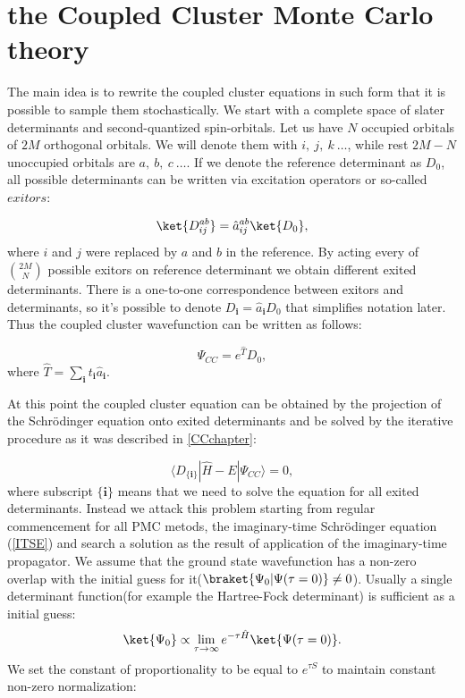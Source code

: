 \documentclass[twoside,english]{uiofysmaster}
\begin{document}
\section{the Coupled Cluster Monte Carlo theory}
The main idea is to rewrite the coupled cluster equations in such form that it is possible to sample them stochastically. We start with a complete space of slater determinants and second-quantized spin-orbitals. Let us have $N$ occupied orbitals of $2M$ orthogonal orbitals. We will denote them with $i,\ j,\ k \ \dots$, while rest $2M-N$ unoccupied orbitals are $a, \ b, \ c \ \dots$.
If we denote the reference determinant as $D_0$, all possible determinants can be written via excitation operators or so-called $exitors$:

\begin{equation}
\ket{D_{ij}^{ab}} = \hat{a}_{ij}^{ab}\ket{ D_0},
\end{equation}
where $i$ and $j$ were replaced  by $a$ and $b$ in the reference. By acting every of $\binom {2M}{N}$ possible exitors on reference determinant we obtain different exited determinants. There is a one-to-one correspondence between exitors and determinants, so it's possible to denote $D_{\boldsymbol{i}} = \hat{a}_{\boldsymbol{i}} D_0$ that simplifies notation later. Thus the coupled cluster wavefunction can be written as follows:

\begin{equation}
\Psi_{CC}=e^{\hat{T}}D_0, 
\end{equation}
where $\hat{T} = \sum_{\boldsymbol{i}} t_{\boldsymbol{i}} \hat{a}_{\boldsymbol{i}}$.

At this point the coupled cluster equation can be obtained by the projection of the Schr\"{o}dinger equation onto exited determinants and be solved by the iterative procedure as it was described in \autoref{CCchapter}:

\begin{equation}\label{CCbf}
\langle D_{\{\boldsymbol{i}\}}|\hat{H}-E|\Psi_{CC}\rangle = 0, 
\end{equation}
where subscript $\{\boldsymbol{i}\}$ means that we need to solve the equation for all exited determinants. Instead we attack this problem starting from regular commencement for all PMC metods, the imaginary-time Schr\"{o}dinger equation (\ref{ITSE}) and search a solution as the result of application of the imaginary-time propagator. We assume that the ground state wavefunction has a non-zero overlap with the initial guess for it($\braket{\Psi_0|\Psi(\tau=0)} \neq 0$). Usually a single determinant function(for example the Hartree-Fock determinant) is sufficient as a initial guess:
\begin{equation}\label{SEsolutionpropagator11}
\ket{\Psi_0} \propto \lim_{\tau \rightarrow \infty} e^{-\tau \hat{H}}\ket{\Psi(\tau = 0)}.
\end{equation}
We set the constant of proportionality to be equal to $e^{\tau S}$ to maintain constant non-zero normalization:
\end{document}
